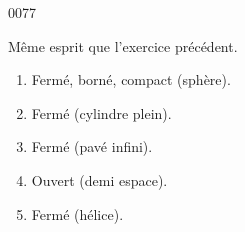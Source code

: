 
\begin{corrige}{0077}

Même esprit que l'exercice précédent.
\begin{enumerate}
	\item Fermé, borné, compact (sphère).
	\item Fermé (cylindre plein).
	\item Fermé (pavé infini).
	\item Ouvert (demi espace).
	\item Fermé (hélice).
\end{enumerate}

\end{corrige}
